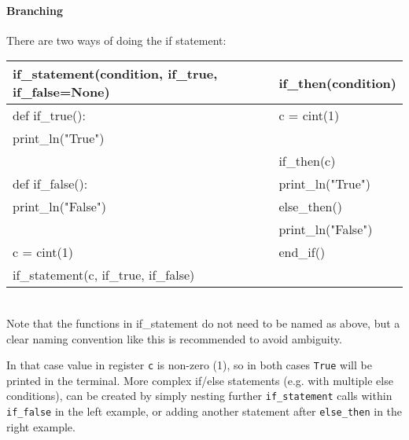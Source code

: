 \paragraph{Branching}
There are two ways of doing the if statement: 
\begin{center}
\begin{tabular}{|l|l|} \hline
\textbf{if_statement(condition, if_true, if_false=None)} & \textbf{if_then(condition)} \\ \hline
def if_true():                                           & c = cint(1)                 \\
\hspace{5 mm}print_ln("True")                            &                             \\
                                                         & if_then(c)                  \\
def if_false():                                          & print_ln("True")            \\
\hspace{5 mm}print_ln("False")                           & else_then()                 \\
                                                         & print_ln("False")           \\
c = cint(1)                                              & end_if()                    \\
if_statement(c, if_true, if_false)                       &                             \\ \hline
\end{tabular}
\begin{footnotesize}
\\ Note that the functions in if_statement do not need to be named as above, but a clear naming convention like this is recommended to avoid ambiguity.
\end{footnotesize}
\end{center}
In that case value in register \verb|c| is non-zero (1), so in both cases \verb|True| will be printed in the terminal. More complex if/else statements (e.g. with multiple else conditions), can be created by simply nesting further \verb|if_statement| calls within \verb|if_false| in the left example, or adding another statement after \verb|else_then| in the right example. \\

